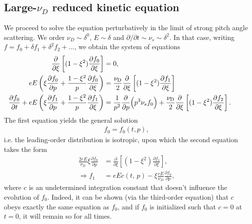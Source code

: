 \documentclass[11pt,a4paper]{article}
\newcommand{\sub}[1]{\ensuremath{_{\text{#1}}}}
\begin{document}
\subsection{Large-$\nu_D$ reduced kinetic equation}

We proceed to solve the equation perturbatively in the limit of strong pitch angle scattering. We order $\nu_D \sim \delta^0$, $E \sim \delta$ and $\partial/\partial t \sim \nu_s \sim \delta^2$. In that case, writing $f=f_0+\delta f_1+\delta^2 f_2 + ...$, we obtain the system of equations
\begin{align}
\frac{\partial}{\partial \xi}\left[(1-\xi^2)\frac{\partial f_0}{\partial \xi}\right] &= 0, \\
 eE\left(\xi\frac{\partial f_0}{\partial p} + \frac{1-\xi^2}{p}\frac{\partial f_0}{\partial \xi}\right) &=  \frac{\nu\sub{D}}{2}\frac{\partial}{\partial \xi}\left[(1-\xi^2)\frac{\partial f_1}{\partial \xi}\right] \\
\hspace{-7mm} \frac{\partial f_0}{\partial t} +eE \left(\xi\frac{\partial f_1}{\partial p} + \frac{1-\xi^2}{p}\frac{\partial f_1}{\partial \xi}\right) &= \frac{1}{p^2}\frac{\partial}{\partial p}\Big(p^3 \nu_s f_0\Big) + \frac{\nu\sub{D}}{2}\frac{\partial}{\partial \xi}\left[(1-\xi^2)\frac{\partial f_2}{\partial \xi}\right].
\end{align}
The first equation yields the general solution
\begin{align}
f_0 = f_0(t,p),
\end{align}
i.e. the leading-order distribution is isotropic, upon which the second equation takes the form
\begin{align}
\frac{2eE}{\nu_D}\xi\frac{\partial f_0}{\partial p } &=\frac{\partial}{\partial \xi}\left[(1-\xi^2)\frac{\partial f_1}{\partial \xi}\right], \nonumber \\
\Rightarrow f_1 &= eE c(t,\,p) - \xi \frac{eE}{\nu_D} \frac{\partial f_0}{\partial p},
\end{align}
where $c$ is an undetermined integration constant that doesn't influence the evolution of $f_0$. Indeed, it can be shown (via the third-order equation) that $c$ obeys exactly the same equation as $f_0$, and if $f_0$ is initialized such that $c=0$ at $t=0$, it will remain so for all times.
\end{document}
